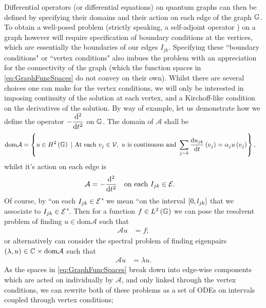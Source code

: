 Differential operators (or differential equations) on quantum graphs can then be defined by specifying their domains and their action on each edge of the graph $\mathbb{G}$.
To obtain a well-posed problem (strictly speaking, a self-adjoint operator ) on a graph however will require specification of boundary conditions at the vertices, which are essentially the boundaries of our edges $I_{jk}$.
Specifying these ``boundary conditions" or ``vertex conditions" also imbues the problem with an appreciation for the connectivity of the graph (which the function spaces in \ref{eq:GraphFuncSpaces} do not convey on their own).
Whilst there are several choices one can make for the vertex conditions, we will only be interested in imposing continuity of the solution at each vertex, and a Kirchoff-like condition on the derivatives of the solution.
By way of example, let us demonstrate how we define the operator $-\dfrac{\mathrm{d}^2 }{\mathrm{d} {t}^2}$ on $\mathbb{G}$.
The domain of $\mathcal{A}$ shall be
\begin{align} \label{eq:ExampleOppDomainDef}
	\mathrm{dom}\mathcal{A} &= \clbracs{ u\in H^2\bracs{\graph} \ \vert \ \text{At each } v_j\in \vertSet, \ u \text{ is continuous and } \sum_{j\con k}\diff{u_{jk}}{t}\bracs{v_j} = \alpha_j u\bracs{v_j} },
\end{align}
whilst it's action on each edge is
\begin{align} \label{eq:ExampleOppEdgeDef}
	\mathcal{A} &= -\dfrac{\mathrm{d}^2 }{\mathrm{d} {t}^2} \quad\text{on each } I_{jk}\in \mathcal{E}.
\end{align}
Of course, by ``on each $I_{jk}\in \mathcal{E}$" we mean ``on the interval $\left[ 0,l_{jk} \right]$ that we associate to $I_{jk}\in \mathcal{E}$".
Then for a function $f\in L^2\left( \mathbb{G} \right)$ we can pose the resolvent problem of finding $u\in\mathrm{dom}\mathcal{A}$ such that
\begin{align*}
	\mathcal{A}u &= f;
\end{align*}
or alternatively can consider the spectral problem of finding eigenpairs $\left( \lambda,u \right)\in\mathbb{C}\times\mathrm{dom}\mathcal{A}$ such that
\begin{align*}
	\mathcal{A}u &= \lambda u.
\end{align*}
As the spaces in \eqref{eq:GraphFuncSpaces} break down into edge-wise components which are acted on individually by $\mathcal{A}$, and only linked through the vertex conditions, we can rewrite both of these problems as a set of ODEs on intervals coupled through vertex conditions;
